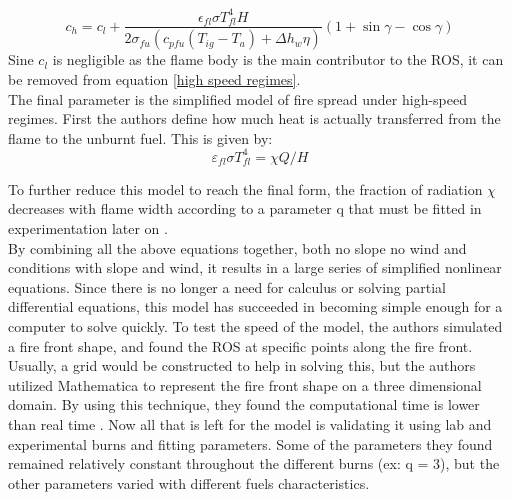 \documentclass{article}
\begin{document}
\begin{equation}
	\label{high speed regimes}
	c_h = c_l  + \frac {\epsilon _{fl} \sigma T^{4}_{fl} H} {2 \sigma _ {fu} (c_{pfu}(T_{ig} - T_a) + \Delta h _ w \eta)} (1 + \sin \gamma - \cos \gamma)
\end{equation}
\indent Sine $c_l$ is negligible as the flame body is the main contributor to the ROS, it can be removed from equation \ref{high speed regimes}.\\
\indent The final parameter is the simplified model of fire spread under high-speed regimes. First the authors define how much heat is actually transferred from the flame to the unburnt fuel. This is given by:
\begin{equation}
	\label{high speed regimes 2007}
	\varepsilon_{fl} \sigma T^{4}_{fl} = \chi Q / H
\end{equation} 

To further reduce this model to reach the final form, the fraction of radiation $\chi$ decreases with flame width according to a parameter q that must be fitted in experimentation later on \citep{Balbi2007}. \\
\indent By combining all the above equations together, both no slope no wind and conditions with slope and wind, it results in a large series of simplified nonlinear equations. Since there is no longer a need for calculus or solving partial differential equations, this model has succeeded in becoming simple enough for a computer to solve quickly. To test the speed of the model, the authors simulated a fire front shape, and found the ROS at specific points along the fire front. Usually, a grid would be constructed to help in solving this, but the authors utilized Mathematica to represent the fire front shape on a three dimensional domain. By using this technique, they found the computational time is lower than real time \citep{Balbi2007}. Now all that is left for the model is validating it using lab and experimental burns and fitting parameters. Some of the parameters they found remained relatively constant throughout the different burns (ex: q = 3), but the other parameters varied with different fuels characteristics. 
\end{document}
